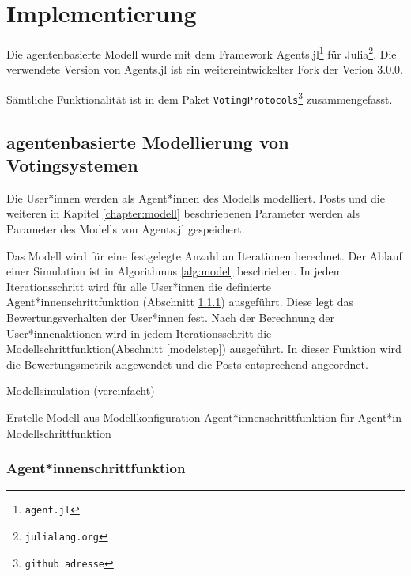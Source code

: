 \chapter{Implementierung}

Die agentenbasierte Modell wurde mit dem Framework Agents.jl\footnote{\texttt{agent.jl}} für Julia\footnote{\texttt{julialang.org}}. Die verwendete Version von Agents.jl ist ein weitereintwickelter Fork der Verion 3.0.0.
	
Sämtliche Funktionalität ist in dem Paket \texttt{VotingProtocols}\footnote{\texttt{github adresse}} zusammengefasst.

\section{agentenbasierte Modellierung von Votingsystemen}

Die User*innen werden als Agent*innen des Modells modelliert. Posts und die weiteren in Kapitel \ref{chapter:modell} beschriebenen Parameter werden als Parameter des Modells von Agents.jl gespeichert. 

Das Modell wird für eine festgelegte Anzahl an Iterationen berechnet. Der Ablauf einer Simulation ist in Algorithmus \ref{alg:model} beschrieben. In jedem Iterationsschritt wird für alle User*innen die definierte Agent*innenschrittfunktion (Abschnitt \ref{agentstep}) ausgeführt. Diese legt das Bewertungsverhalten der User*innen fest. Nach der Berechnung der User*innenaktionen wird in jedem Iterationsschritt die Modellschrittfunktion(Abschnitt \ref{modelstep}) ausgeführt. In dieser Funktion wird die Bewertungsmetrik angewendet und die Posts entsprechend angeordnet.


\begin{algorithm}
	\label{alg:model}
	\caption{Modellsimulation (vereinfacht)}
	\begin{algorithmic}
			\State Erstelle Modell aus Modellkonfiguration
					\State Agent*innenschrittfunktion für Agent*in
				\EndFor
				\State Modellschrittfunktion
			\EndFor
	\end{algorithmic}
\end{algorithm}

\subsection{Agent*innenschrittfunktion}
\label{agentstep}

